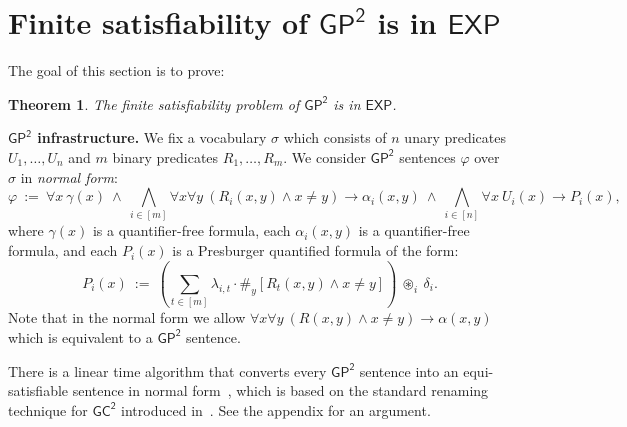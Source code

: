 \documentclass[10pt,a4paper]{article}
\newtheorem{theorem}{Theorem}
\theoremstyle{definition}
\theoremstyle{remark}
\newcommand{\myparagraph}[1]{\medskip\noindent \textbf{#1.}}
\newcommand{\vocab}{\sigma}
\newcommand{\mexp}  {\mathsf{EXP}}
\newcommand{\expp}  {\mathsf{EXP}}
\newcommand{\GCtwo}   {\mathsf{GC^2}}
\newcommand{\GPtwo}   {\mathsf{GP^2}}
\newcommand{\presby}[1]  {{\#_y\left[ #1 \right]}}
\newcommand{\intsinterval}[1]{{\left[ #1 \right]}}
\begin{document}
\section{Finite satisfiability of $\GPtwo$ is in $\expp$}\label{sec:gptwo}

The goal of this section is to prove:
\begin{theorem} \label{thm:gptwoexp}
    The finite satisfiability problem of $\GPtwo$ is in $\mexp$.
\end{theorem}

\myparagraph{$\GPtwo$ infrastructure}
We fix a vocabulary $\vocab$ which consists of $n$ unary predicates $U_1, \ldots, U_n$ and $m$ binary predicates $R_1, \ldots, R_m$.
We consider $\GPtwo$ sentences $\varphi$ over $\vocab$ in \emph{normal form}:
\begin{equation*}
    \varphi\ :=\ 
    \forall x\ \gamma(x)\ \land\ 
    \bigwedge_{i \in \intsinterval{m}} \forall x \forall y\ \left(R_i(x,y) \land x \neq y\right) \to \alpha_i(x, y)\ \land\ 
    \bigwedge_{i \in \intsinterval{n}} \forall x\ U_i(x) \to P_i(x),
\end{equation*}
where $\gamma(x)$ is a quantifier-free formula,
each $\alpha_i(x, y)$ is a quantifier-free formula, and
each $P_i(x)$ is a Presburger quantified formula of the form: 
\begin{equation*}
    P_i(x)\ :=\ \left(
        \sum_{t \in \intsinterval{m}} \lambda_{i, t} \cdot \presby{R_t(x, y) \land x \neq y}\right)
    \ \circledast_i\ \delta_i.
\end{equation*}
Note that in the normal form we allow
$
\forall x \forall y\ \left(R(x,y) \land x \neq y\right) \to \alpha(x, y)
$
which is equivalent to a $\GPtwo$  sentence.

There is a linear time algorithm that converts every $\GPtwo$ sentence into an equi-satisfiable sentence in normal form~\cite{twovarpres}, which is 
based on the standard renaming technique for $\GCtwo$ introduced in~\cite{Kazakov04,gctwocomplexity}.
See the appendix for an argument.
\end{document}
